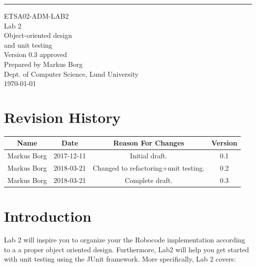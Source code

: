\documentclass{scrreprt}
\date{}
\def\myversion{0.3 }
\begin{document}
\begin{flushright}
    \rule{16cm}{5pt}\vskip1cm
    \begin{bfseries}
    	\LARGE{ETSA02-ADM-LAB2}\\
    	\vspace{1.5cm}
        \Huge{Lab 2}\\
        \vspace{0.5cm}
        Object-oriented design\\
        \vspace{0.5cm}
        and unit testing\\
        \vspace{1.5cm}
        \LARGE{Version \myversion approved}\\
        \vspace{1.5cm}
        Prepared by Markus Borg\\
        Dept. of Computer Science, Lund University\\
        \vspace{1.5cm}
        \today\\
    \end{bfseries}
\end{flushright}


\chapter*{Revision History}

\begin{center}
    \begin{tabular}{|c|c|c|c|}
        \hline
	    Name & Date & Reason For Changes & Version\\
        \hline
	    Markus Borg & 2017-12-11 & Initial draft. & 0.1\\
        \hline
        Markus Borg & 2018-03-21 & Changed to refactoring+unit testing. & 0.2\\
        \hline
        Markus Borg & 2018-03-21 & Complete draft. & 0.3\\
        \hline
    \end{tabular}
\end{center}

\chapter{Introduction}
Lab 2 will inspire you to organize your the Robocode implementation according to a a proper object oriented design. Furthermore, Lab2 will help you get started with unit testing using the JUnit framework. More specifically, Lab 2 covers:
\end{document}
